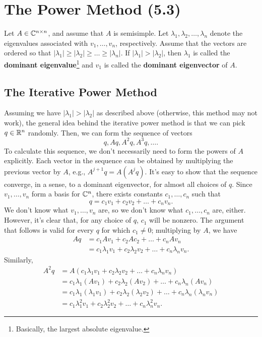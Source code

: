 \documentclass[letterpaper]{article}
\newcommand{\0}{\mathbf{0}}
\begin{document}
\section{The Power Method (5.3)}
Let $A \in \mathbb{C}^{n \times n}$, and assume that $A$ is semisimple. Let $\lambda_1, \lambda_2, \hdots, \lambda_n$ denote the eigenvalues associated with $v_1, \hdots, v_n$, respectively. Assume that the vectors are ordered so that $|\lambda_1| \geq |\lambda_2| \geq \hdots \geq |\lambda_n|$. If $|\lambda_1| > |\lambda_2|$, then $\lambda_1$ is called the \textbf{dominant eigenvalue}\footnote{Basically, the largest absolute eigenvalue.} and $v_1$ is called the \textbf{dominant eigenvector} of $A$.  

\subsection{The Iterative Power Method}
Assuming we have $|\lambda_1| > |\lambda_2|$ as described above (otherwise, this method may not work), the general idea behind the iterative power method is that we can pick $q \in \mathbb{R}^n$ randomly. Then, we can form the sequence of vectors
\[q, Aq, A^2 q, A^3 q, \hdots.\]
To calculate this sequence, we don't necessarily need to form the powers of $A$ explicitly. Each vector in the sequence can be obtained by multiplying the previous vector by $A$, e.g., $A^{j + 1}q = A(A^j q)$. It's easy to show that the sequence converge, in a sense, to a dominant eigenvector, for almost all choices of $q$. Since $v_1, \hdots, v_n$ form a basis for $\mathbb{C}^n$, there exists constants $c_1, \hdots, c_n$ such that  
\[q = c_1 v_1 + c_2 v_2 + \hdots + c_n v_n.\]
We don't know what $v_1, \hdots, v_n$ are, so we don't know what $c_1, \hdots, c_n$ are, either. However, it's clear that, for any choice of $q$, $c_1$ will be nonzero. The argument that follows is valid for every $q$ for which $c_1 \neq 0$; multiplying by $A$, we have 
\begin{equation*}
    \begin{aligned}
        Aq &= c_1 Av_1 + c_2 Ac_2 + \hdots + c_n Av_n \\ 
            &= c_1 \lambda_1 v_1 + c_2 \lambda_2 v_2 + \hdots + c_n  \lambda_n v_n.
    \end{aligned}
\end{equation*}
Similarly, 
\begin{equation*}
    \begin{aligned}
        A^2 q &= A(c_1 \lambda_1 v_1 + c_2 \lambda_2 v_2 + \hdots + c_n  \lambda_n v_n) \\
            &= c_1 \lambda_1 (Av_1) + c_2 \lambda_2 (Av_2) + \hdots + c_n \lambda_n (Av_n) \\ 
            &= c_1 \lambda_1 (\lambda_1 v_1) + c_2 \lambda_2 (\lambda_2 v_2) + \hdots + c_n \lambda_n (\lambda_n v_n) \\ 
            &= c_1 \lambda_1^2 v_1 + c_2 \lambda_2^2 v_2 + \hdots + c_n \lambda_n^2 v_n.
    \end{aligned}
\end{equation*}
\end{document}

